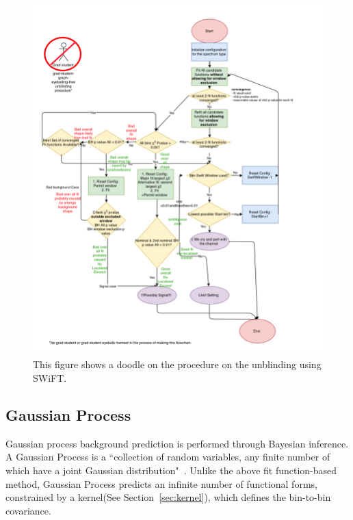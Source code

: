 \begin{figure}[!htb] \begin{center}
        \includegraphics[width=1.05\textwidth]{figures/chapter_analysismethod/swift_unblindingflowchart}
        \caption{
            This figure shows a doodle on the procedure on the unblinding using SWiFT.
        }
        \label{fig:unblinding}
    \end{center}
\end{figure}
\FloatBarrier
    
    \subsection{Gaussian Process} 
    \label{sec:GP}

    Gaussian process background prediction is performed through Bayesian inference. A Gaussian Process is a ``collection of random variables, any finite number of which have a joint Gaussian distribution"~\cite{rasmussen2003gaussian}. Unlike the above fit function-based method, Gaussian Process predicts an infinite number of functional forms, constrained by a kernel(See Section~\ref{sec:kernel}), which defines the bin-to-bin covariance.

